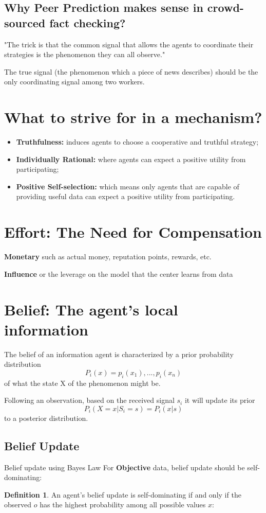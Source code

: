 \documentclass{report}
\theoremstyle{definition}
\newcommand{\nitem}[1][]{\item \textbf{#1:}}
\newtheorem{definition}{Definition}
\begin{document}
\begin{itemize}
\subsection{Why Peer Prediction makes sense in crowd-sourced fact checking?}

"The trick is that the common signal that allows the agents to coordinate their strategies is the phenomenon they can all observe."

The true signal (the phenomenon which a piece of news describes) should be the only coordinating signal among two workers. 


\section{What to strive for in a mechanism?}
\begin{itemize}
    \nitem [Truthfulness] induces agents to choose a cooperative and truthful strategy;
    \nitem[Individually Rational] where agents can expect a positive utility from participating;
    \nitem[Positive Self-selection] which means only agents that are capable of providing useful data can expect a positive utility from participating.
\end{itemize}

\section{Effort: The Need for Compensation}
\textbf{Monetary} such as actual money, reputation points, rewards, etc.


\textbf{Influence} or the leverage on the model that the center learns from data


\section{Belief: The agent's local information}
The belief of an information agent is characterized by a prior probability distribution 
\begin{equation}
    P_i(x) = {p_i(x_1), ..., p_i(x_n)}
\end{equation}
of what the state X of the phenomenon might be.

Following an observation, based on the received signal $s_i$ it will update its prior 
\begin{equation}
    P_i(X=x | S_i = s) = P_i(x|s)
\end{equation}
to a posterior distribution.

\subsection{Belief Update}
Belief update using Bayes Law
For \textbf{Objective} data, belief update should be  self-dominating: 	
\begin{definition} An agent's belief update is self-dominating if and only if the observed $o$ has the highest probability among all possible values $x$:


\end{definition}
\end{itemize}
\end{document}
